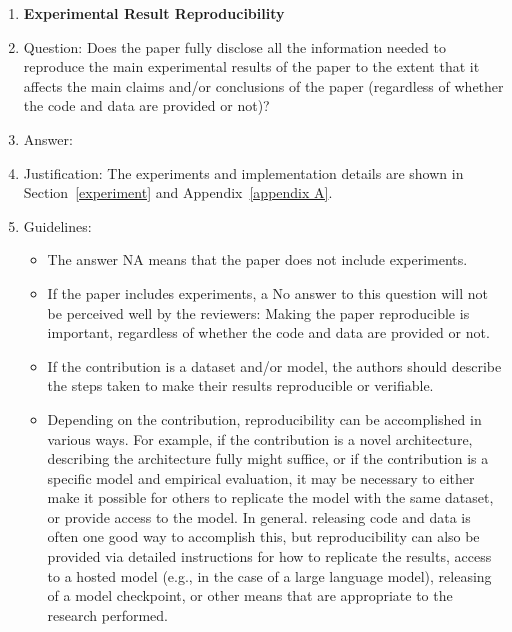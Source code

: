 \documentclass{article}
\begin{document}
\begin{enumerate}
\begin{itemize}
        \item The proofs can either appear in the main paper or the supplemental material, but if they appear in the supplemental material, the authors are encouraged to provide a short proof sketch to provide intuition.
        \item Inversely, any informal proof provided in the core of the paper should be complemented by formal proofs provided in appendix or supplemental material.
        \item Theorems and Lemmas that the proof relies upon should be properly referenced.
    \end{itemize}
    \item {\bf Experimental Result Reproducibility}
    \item[] Question: Does the paper fully disclose all the information needed to reproduce the main experimental results of the paper to the extent that it affects the main claims and/or conclusions of the paper (regardless of whether the code and data are provided or not)?
    \item[] Answer: \answerYes{}
    \item[] Justification: The experiments and implementation details are shown in Section~\ref{experiment} and Appendix~\ref{appendix A}.
    \item[] Guidelines:
    \begin{itemize}
        \item The answer NA means that the paper does not include experiments.
        \item If the paper includes experiments, a No answer to this question will not be perceived well by the reviewers: Making the paper reproducible is important, regardless of whether the code and data are provided or not.
        \item If the contribution is a dataset and/or model, the authors should describe the steps taken to make their results reproducible or verifiable.
        \item Depending on the contribution, reproducibility can be accomplished in various ways. For example, if the contribution is a novel architecture, describing the architecture fully might suffice, or if the contribution is a specific model and empirical evaluation, it may be necessary to either make it possible for others to replicate the model with the same dataset, or provide access to the model. In general. releasing code and data is often one good way to accomplish this, but reproducibility can also be provided via detailed instructions for how to replicate the results, access to a hosted model (e.g., in the case of a large language model), releasing of a model checkpoint, or other means that are appropriate to the research performed.

\end{itemize}
\end{enumerate}
\end{document}
